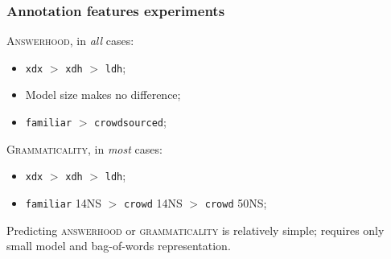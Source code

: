 \documentclass[handout,xcolor={dvipsnames}]{beamer}
\newcommand{\feat}[1]{\textsc{#1}}
\newcommand{\param}[1]{\texttt{#1}}
\begin{document}
\begin{frame}

\vspace{-1em}
\frametitle{Annotation features experiments}

\feat{Answerhood}, in \textit{all} cases:
\begin{itemize}
\item \param{xdx} $>$ \param{xdh} $>$ \param{ldh};
\item Model size makes no difference;
\item \param{familiar} $>$ \param{crowdsourced};
\end{itemize}

\vspace{1em}

\feat{Grammaticality}, in \textit{most} cases:
\begin{itemize}
\item \param{xdx} $>$ \param{xdh} $>$ \param{ldh};
\item \param{familiar} 14NS $>$ \param{crowd} 14NS $>$ \param{crowd} 50NS;
\end{itemize}

\vspace{1em}

Predicting \feat{answerhood} or \feat{grammaticality} is relatively simple; requires only small model and bag-of-words representation.

\end{frame}
\end{document}
